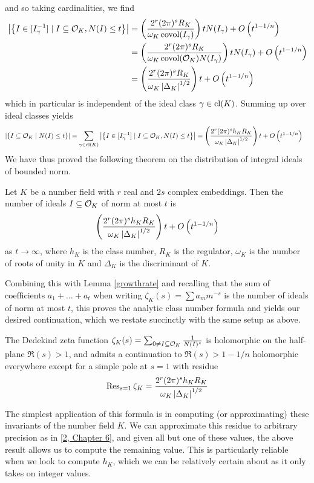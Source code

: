 \documentclass[11pt]{report}
\begin{document}
and so taking cardinalities, we find
\begin{align*}
    \left| \left\{  I \in [I_{\gamma}^{-1}] \mid I \subseteq \mathcal{O}_K, N(I) \leq t  \right\} \right| &= \left(  \frac{2^r(2\pi)^s R_K}{\omega_K \operatorname{covol}(I_\gamma)}  \right)tN(I_\gamma) + O\left(  t^{1 - 1/n}  \right) \\
    &= \left(  \frac{2^r(2\pi)^s R_K}{\omega_K \operatorname{covol}(\mathcal{O}_K)N(I_\gamma)}  \right)tN(I_\gamma) + O\left(  t^{1 - 1/n}  \right) \\
    &= \left(  \frac{2^r(2\pi)^s R_K}{\omega_K \left| \Delta_K \right|^{1/2}}  \right)t + O\left(  t^{1 - 1/n}  \right)
\end{align*}
which in particular is independent of the ideal class $\gamma \in \operatorname{cl}(K)$. Summing up over ideal classes yields
\begin{align*}
    \left| \left\{  I \subseteq \mathcal{O}_K \mid N(I) \leq t  \right\} \right| &= \sum_{\gamma \in \operatorname{cl}(K)}\left| \left\{  I \in [I_{\gamma}^{-1}] \mid I \subseteq \mathcal{O}_K, N(I) \leq t  \right\} \right| = \left(  \frac{2^r(2\pi)^s h_KR_K}{\omega_K \left| \Delta_K \right|^{1/2}}  \right)t + O\left(  t^{1 - 1/n}  \right)
\end{align*}
We have thus proved the following theorem on the distribution of integral ideals of bounded norm.
\begin{theorem}
    Let $K$ be a number field with $r$ real and $2s$ complex embeddings. Then the number of ideals $I \subseteq \mathcal{O}_K$ of norm at most $t$ is
    $$
        \left(  \frac{2^r(2\pi)^s h_KR_K}{\omega_K\left| \Delta_K \right|^{1/2}}  \right)t + O\left(  t^{1 - 1/n}  \right)
    $$
    as $t \to \infty$, where $h_K$ is the class number, $R_K$ is the regulator, $\omega_K$ is the number of roots of unity in $K$ and $\Delta_K$ is the discriminant of $K$.
\end{theorem}
Combining this with Lemma \ref{growthrate} and recalling that the sum of coefficients $a_1 + \ldots + a_t$ when writing $\zeta_K(s) = \sum a_mm^{-s}$ is the number of ideals of norm at most $t$, this proves the analytic class number formula and yields our desired continuation, which we restate succinctly with the same setup as above.
\begin{theorem}
    The Dedekind zeta function $\zeta_K(s) = \sum_{0 \neq I \subseteq \mathcal{O}_K} \frac{1}{N(I)^s}$ is holomorphic on the half-plane $\Re(s) > 1$, and admits a continuation to $\Re(s) > 1 - 1/n$ holomorphic everywhere except for a simple pole at $s = 1$ with residue
    $$
        \operatorname{Res}_{s = 1}\zeta_K = \frac{2^r(2\pi)^sh_KR_K}{\omega_K\left| \Delta_K \right|^{1/2}}
    $$
\end{theorem}
The simplest application of this formula is in computing (or approximating) these invariants of the number field $K$. We can approximate this residue to arbitrary precision as in \hyperlink{stevenhagen}{[2, Chapter 6]}, and given all but one of these values, the above result allows us to compute the remaining value. This is particularly reliable when we look to compute $h_K$, which we can be relatively certain about as it only takes on integer values.
\end{document}
